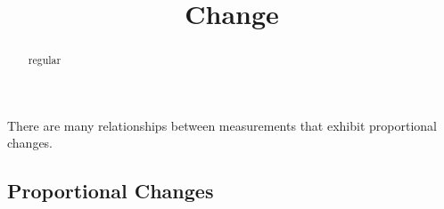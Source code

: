 \documentclass{ximera}
\title{Change}
\begin{document}
\begin{abstract}
regular
\end{abstract}
\maketitle




There are many relationships between measurements that exhibit proportional changes.  







\subsection*{Proportional Changes}
\end{document}
